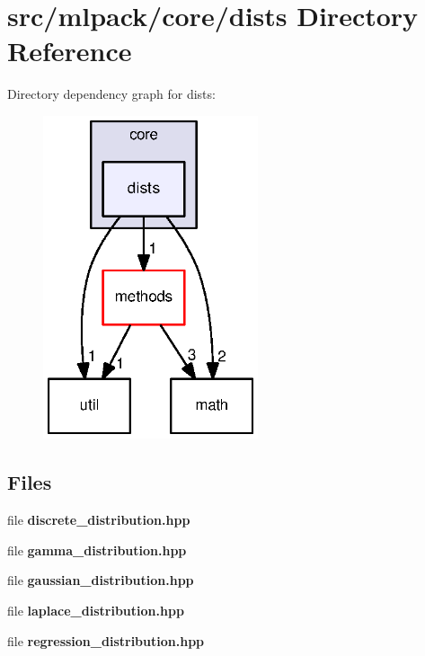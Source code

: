 \section{src/mlpack/core/dists Directory Reference}
\label{dir_1d29dda40ef36f6615cae6f86e87bfd7}
Directory dependency graph for dists\+:
\nopagebreak
\begin{figure}[H]
\begin{center}
\leavevmode
\includegraphics[width=179pt]{dir_1d29dda40ef36f6615cae6f86e87bfd7_dep}
\end{center}
\end{figure}
\subsection*{Files}
\begin{DoxyCompactItemize}
\item 
file {\bf discrete\+\_\+distribution.\+hpp}
\item 
file {\bf gamma\+\_\+distribution.\+hpp}
\item 
file {\bf gaussian\+\_\+distribution.\+hpp}
\item 
file {\bf laplace\+\_\+distribution.\+hpp}
\item 
file {\bf regression\+\_\+distribution.\+hpp}
\end{DoxyCompactItemize}
